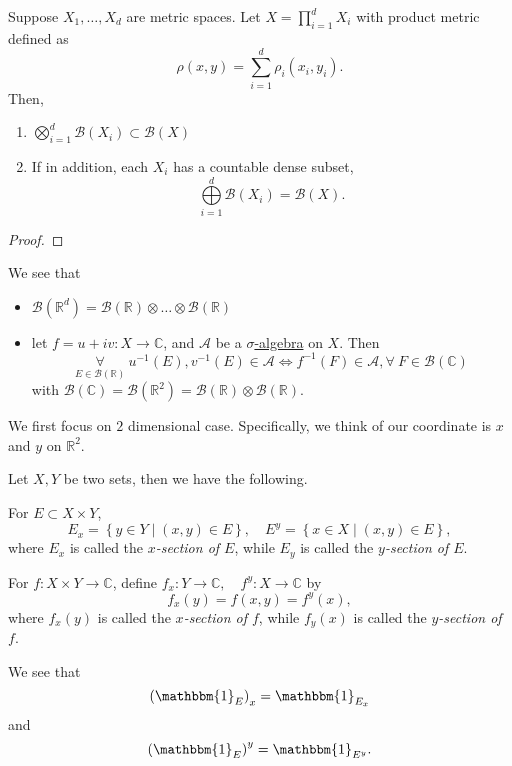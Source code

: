 \begin{theorem}
	Suppose \(X_1, \dots , X_d \) are metric spaces. Let \(X = \prod\limits_{i=1}^{d} X_{i}\) with product metric defined as
	\[
		\rho (x, y) = \sum\limits_{i=1}^{d} \rho _{i}(x_{i}, y_{i}).
	\]
	Then,
	\begin{enumerate}[(1)]
		\item \(\bigotimes\limits_{i=1}^{d}\mathcal{B} (X_{i})\subset \mathcal{B} (X)\)
		\item If in addition, each \(X_{i}\) has a countable dense subset,
		      \[
			      \bigoplus\limits_{i=1}^{d}\mathcal{B} (X_{i}) = \mathcal{B} (X).
		      \]
	\end{enumerate}
\end{theorem}
\begin{proof}
\end{proof}

\begin{remark}
	We see that
	\begin{itemize}
		\item \(\mathcal{B} (\mathbb{R} ^d) = \mathcal{B} (\mathbb{R} )\otimes \dots \otimes \mathcal{B} (\mathbb{R} ) \)
		\item let \(f = u + iv\colon X\to \mathbb{C} \), and \(\mathcal{A} \) be a \hyperref[def:sigma-algebra]{\(\sigma\)-algebra} on \(X\). Then
		      \[
			      \underset{E\in \mathcal{B} (\mathbb{R} )}{\forall }\ u^{-1} (E), v^{-1} (E)\in \mathcal{A}
			      \iff
			      f^{-1} (F)\in \mathcal{A}, \forall\ F\in \mathcal{B} (\mathbb{C} )
		      \]
		      with \(\mathcal{B} (\mathbb{C} ) = \mathcal{B} (\mathbb{R} ^2) = \mathcal{B} (\mathbb{R} )\otimes \mathcal{B} (\mathbb{R} )\).
	\end{itemize}
\end{remark}

We first focus on \(2\) dimensional case. Specifically, we think of our coordinate is \(x\) and \(y\) on \(\mathbb{R} ^2\).

\begin{definition*}
	Let \(X, Y\) be two sets, then we have the following.
	\begin{definition}
		For \(E\subset X\times Y\),
		\[
			E_x = \left\{y\in Y \mid (x, y)\in E\right\},\quad E^y = \left\{x\in X \mid (x, y)\in E\right\},
		\]
		where \(E_x\) is called the \emph{\(x\)-section of \(E\)}, while \(E_y\) is called the \emph{\(y\)-section of \(E\)}.
	\end{definition}
	\begin{definition}
		For \(f\colon X\times Y\to \mathbb{C} \), define \(f_x\colon Y\to \mathbb{C} ,\quad f^y\colon X\to \mathbb{C}\)
		by
		\[
			f_x(y) = f(x, y) = f^y(x),
		\]
		where \(f_x(y)\) is called the \emph{\(x\)-section of \(f\)}, while \(f_y(x)\) is called the \emph{\(y\)-section of \(f\)}.
	\end{definition}
\end{definition*}
\begin{eg}
	We see that
	\[
		\left(\mathbbm{1}_{E} \right)_x = \mathbbm{1}_{E_x}
	\]
	and
	\[
		\left(\mathbbm{1}_{E} \right)^y = \mathbbm{1}_{E^y}.
	\]
\end{eg}

